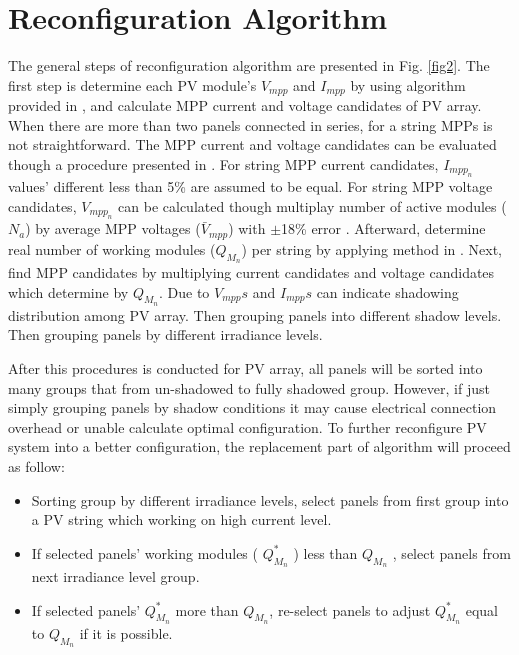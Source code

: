 \documentclass[conference]{IEEEtran}
\begin{document}
\section{Reconfiguration Algorithm}
The general steps of reconfiguration algorithm are presented in Fig. \ref{fig2}. The first step is determine each PV module's \textit{$V_{mpp}$} and \textit{$I_{mpp}$} by using algorithm provided in \cite{b7} \cite{b9}, and calculate MPP current and voltage candidates of PV array. When there are more than two panels connected in series, for a string MPPs is not straightforward. The MPP current and voltage candidates can be evaluated though a procedure presented in \cite{b10}. For string MPP current candidates, \textit{$I_{mpp_n}$} values' different less than 5\% are assumed to be equal. For string MPP voltage candidates, \textit{$V_{mpp_n}$}  can be calculated though multiplay number of active modules (\textit{$N_a$}) by average MPP voltages (\textit{$\bar V_{mpp}$}) with $\pm$18\% error \cite{b10}. Afterward, determine real number of working modules (\textit{$Q_{M_n}$})  per string by applying method in \cite{b10}. Next, find MPP candidates by multiplying current candidates and voltage candidates which determine by \textit{$Q_{M_n}$}. Due to \textit{$V_{mpp}s$} and \textit{$I_{mpp}s$} can indicate shadowing distribution among PV array.  Then grouping panels into different shadow levels. Then grouping panels by different irradiance levels. 

After this procedures is conducted for PV array, all panels will be sorted into many groups that from un-shadowed to fully shadowed group. However, if just simply grouping panels by shadow conditions it may cause electrical connection overhead or unable calculate optimal configuration. To further reconfigure PV system into a better configuration, the replacement part of algorithm will proceed as follow:
\begin{itemize}
\item Sorting group by different irradiance levels, select panels from first group into a PV string which working on high current level.
\item If selected panels' working modules ( \textit{$Q_{M_n}^{*}$} ) less than \textit{$Q_{M_n}$} , select panels from next irradiance level group.
\item If selected panels' \textit{$Q_{M_n}^{*}$} more than \textit{$Q_{M_n}$}, re-select panels to adjust \textit{$Q_{M_n}^{*}$} equal to \textit{$Q_{M_n}$} if it is possible. 
\end{itemize}
\end{document}
